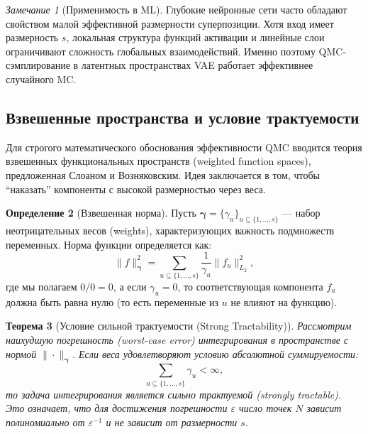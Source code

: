 \documentclass[12pt, a4paper]{article}
\theoremstyle{plain}
\newtheorem{theorem}{Теорема}[section]
\theoremstyle{definition}
\newtheorem{definition}[theorem]{Определение}
\theoremstyle{remark}
\newtheorem{remark}[theorem]{Замечание}
\newcommand{\Is}{\{1, \dots, s\}}
\begin{document}
\begin{remark}[Применимость в ML]
    Глубокие нейронные сети часто обладают свойством малой эффективной размерности суперпозиции. Хотя вход имеет размерность $s$, локальная структура функций активации и линейные слои ограничивают сложность глобальных взаимодействий. Именно поэтому QMC-сэмплирование в латентных пространствах VAE работает эффективнее случайного MC.
\end{remark}

\subsection{Взвешенные пространства и условие трактуемости}
Для строгого математического обоснования эффективности QMC вводится теория взвешенных функциональных пространств (weighted function spaces), предложенная Слоаном и Возняковским. Идея заключается в том, чтобы ``наказать'' компоненты с высокой размерностью через веса.

\begin{definition}[Взвешенная норма]
    Пусть $\boldsymbol{\gamma} = \{\gamma_u\}_{u \subseteq \Is}$ --- набор неотрицательных весов (weights), характеризующих важность подмножеств переменных. Норма функции определяется как:
    \begin{equation}
        \|f\|_{\boldsymbol{\gamma}}^2 = \sum_{u \subseteq \Is} \frac{1}{\gamma_u} \|f_u\|_{L_2}^2,
    \end{equation}
    где мы полагаем $0/0 = 0$, а если $\gamma_u = 0$, то соответствующая компонента $f_u$ должна быть равна нулю (то есть переменные из $u$ не влияют на функцию).
\end{definition}

\begin{theorem}[Условие сильной трактуемости (Strong Tractability)]
    \label{thm:tractability}
    Рассмотрим наихудшую погрешность (worst-case error) интегрирования в пространстве с нормой $\|\cdot\|_{\boldsymbol{\gamma}}$. Если веса удовлетворяют условию абсолютной суммируемости:
    \begin{equation}
        \sum_{u \subseteq \Is} \gamma_u < \infty,
    \end{equation}
    то задача интегрирования является \textit{сильно трактуемой} (strongly tractable). Это означает, что для достижения погрешности $\varepsilon$ число точек $N$ зависит полиномиально от $\varepsilon^{-1}$ и \textit{не зависит} от размерности $s$.
\end{theorem}
\end{document}
